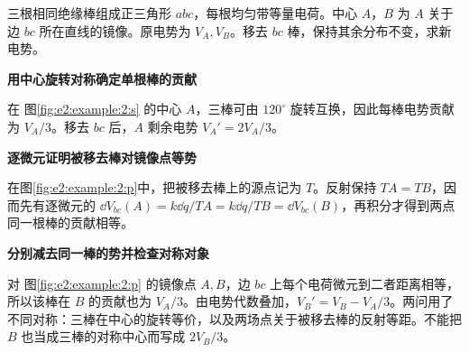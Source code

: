 \begin{question}\begin{example}[移去正三角形的一根带电棒]\label{e2:example:2}
三根相同绝缘棒组成正三角形 $abc$，每根均匀带等量电荷。中心 $A$，$B$ 为 $A$ 关于边 $bc$ 所在直线的镜像。原电势为 $V_A,V_B$。移去 $bc$ 棒，保持其余分布不变，求新电势。
\end{example}
\end{question}
\begin{solution}\textbf{用中心旋转对称确定单根棒的贡献}\par\nobreak
在 图\ref{fig:e2:example:2:s} 的中心 $A$，三棒可由 $120^\circ$ 旋转互换，因此每棒电势贡献为 $V_A/3$。移去 $bc$ 后，$A$ 剩余电势 $V_A'=2V_A/3$。



\par\medskip{}\noindent\textbf{逐微元证明被移去棒对镜像点等势}\par\nobreak
在图\ref{fig:e2:example:2:p}中，把被移去棒上的源点记为 $T$。反射保持 $TA=TB$，因而先有逐微元的 $\dd V_{bc}(A)=k\dd q/TA=k\dd q/TB=\dd V_{bc}(B)$，再积分才得到两点同一根棒的贡献相等。



\par\medskip{}\noindent\textbf{分别减去同一棒的势并检查对称对象}\par\nobreak
对 图\ref{fig:e2:example:2:p} 的镜像点 $A,B$，边 $bc$ 上每个电荷微元到二者距离相等，所以该棒在 $B$ 的贡献也为 $V_A/3$。由电势代数叠加，$V_B'=V_B-V_A/3$。两问用了不同对称：三棒在中心的旋转等价，以及两场点关于被移去棒的反射等距。不能把 $B$ 也当成三棒的对称中心而写成 $2V_B/3$。\end{solution}
